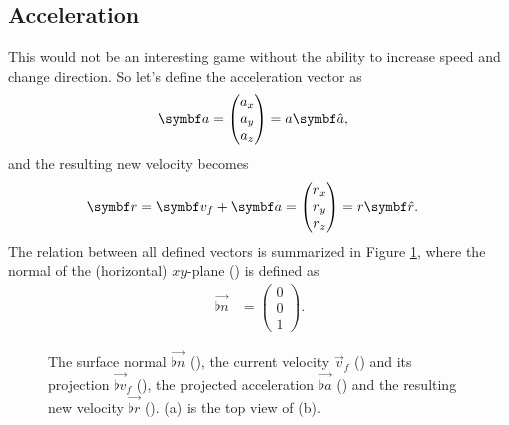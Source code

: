 
\subsection{Acceleration}
This would not be an interesting game without the ability to increase speed and change direction. So let's define the acceleration vector as
\begin{align*}
\vec{a} &=
\begin{pmatrix}
a_x \\ a_y \\ a_z
\end{pmatrix} = a \uvec{a},
\end{align*}
and the resulting new velocity becomes
\begin{align*}
\vec{r} &= \vec{v}_{f} + \vec{a} =
\begin{pmatrix}
r_x \\ r_y \\ r_z
\end{pmatrix} = r \uvec{r}.
\end{align*}
The relation between all defined vectors is summarized in Figure \ref{fig:delta_phi}, where the normal of the (horizontal) $xy$-plane (\greenarea) is defined as
\begin{align*}
\vec{\flat{n}} &=
\begin{pmatrix}
0\\0\\1
\end{pmatrix}.
\end{align*}
\begin{figure}[H]
	\centering
	\begin{subfigure}[t]{.5\textwidth}
		\centering
		\setlength\figureheight{5.5cm}
		\setlength\figurewidth{5.5cm}
		\caption{}
	\end{subfigure}%
	\begin{subfigure}[t]{.5\textwidth}
		\centering
		\setlength\figureheight{9.5cm}
		\setlength\figurewidth{9.5cm}
		\caption{}
	\end{subfigure}%
	\caption{The surface normal $\vec{\flat{n}}$ (\greenarrow), the current velocity $\vec{v}_f$ (\yellowdenselydottedarrow) and its projection $\vec{\flat{v}}_f$ (\yellowarrow), the projected acceleration $\vec{\flat{a}}$ (\orangearrow) and the resulting new velocity $\vec{\flat{r}}$ (\bluearrow). (a) is the top view of (b).}
	\label{fig:delta_phi}
\end{figure}

